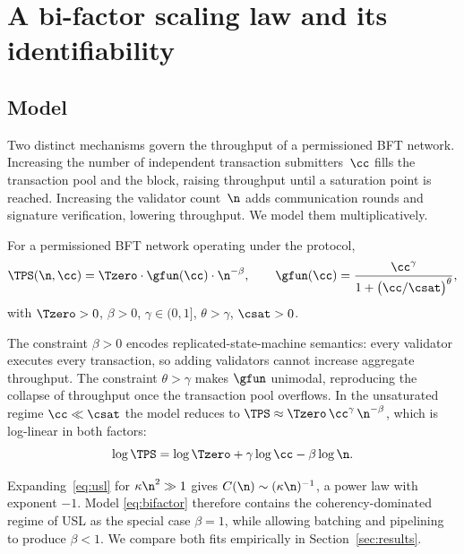 \section{A bi-factor scaling law and its identifiability}
\label{sec:bifactor}

\subsection{Model}

Two distinct mechanisms govern the throughput of a permissioned BFT network.
Increasing the number of independent transaction submitters~$\cc$ fills the
transaction pool and the block, raising throughput until a saturation point is
reached. Increasing the validator count~$\n$ adds communication rounds and
signature verification, lowering throughput. We model them multiplicatively.

\begin{Def}
\label{def:bifactor}
For a permissioned BFT network operating under the \RNM{} protocol,
\begin{equation}
\TPS(\n,\cc)=\Tzero\cdot\gfun(\cc)\cdot\n^{-\beta},
\qquad
\gfun(\cc)=\frac{\cc^{\gamma}}{1+\bigl(\cc/\csat\bigr)^{\theta}},
\label{eq:bifactor}
\end{equation}
with $\Tzero>0$, $\beta>0$, $\gamma\in(0,1]$, $\theta>\gamma$, $\csat>0$.
\end{Def}

The constraint $\beta>0$ encodes replicated-state-machine semantics: every
validator executes every transaction, so adding validators cannot increase
aggregate throughput. The constraint $\theta>\gamma$ makes $\gfun$ unimodal,
reproducing the collapse of throughput once the transaction pool overflows. In
the unsaturated regime $\cc\ll\csat$ the model reduces to
$\TPS\approx\Tzero\,\cc^{\gamma}\,\n^{-\beta}$, which is log-linear in both
factors:
\begin{equation}
\log\TPS=\log\Tzero+\gamma\log\cc-\beta\log\n .
\label{eq:loglinear}
\end{equation}

\begin{Remark}
Expanding~\eqref{eq:usl} for $\kappa\n^{2}\gg1$ gives
$C(\n)\sim(\kappa\n)^{-1}$, \ie{} a power law with exponent $-1$. Model
\eqref{eq:bifactor} therefore contains the coherency-dominated regime of USL as
the special case $\beta=1$, while allowing batching and pipelining to produce
$\beta<1$. We compare both fits empirically in Section~\ref{sec:results}.
\end{Remark}

